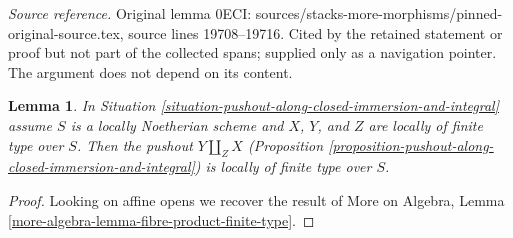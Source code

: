 \documentclass[10pt,a4paper]{amsart}
\theoremstyle{plain}
\newtheorem{lemma}[subsection]{Lemma}
\theoremstyle{definition}
\theoremstyle{remark}
\numberwithin{equation}{subsection}
\begin{document}
\noindent\textit{Source reference.} Original lemma 0ECI: sources/stacks-more-morphisms/pinned-original-source.tex, source lines 19708--19716. Cited by the retained statement or proof but not part of the collected spans; supplied only as a navigation pointer. The argument does not depend on its content.\par\medskip
\begin{lemma}
\label{lemma-pushout-finite-type}
In Situation \ref{situation-pushout-along-closed-immersion-and-integral}
assume $S$ is a locally Noetherian scheme and $X$, $Y$, and $Z$
are locally of finite type over $S$. Then the pushout $Y \amalg_Z X$
(Proposition \ref{proposition-pushout-along-closed-immersion-and-integral})
is locally of finite type over $S$.
\end{lemma}

\begin{proof}
Looking on affine opens we recover the result of
More on Algebra, Lemma \ref{more-algebra-lemma-fibre-product-finite-type}.
\end{proof}
\end{document}
